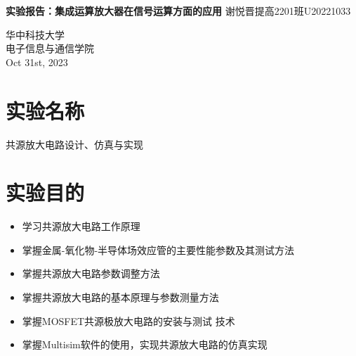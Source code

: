 \documentclass[a4paper,11pt,UTF8]{article}
\numberwithin{equation}{subsection}
\begin{document}
\begin{titlepage}
	\begin{center}
		\vspace*{1cm}
		\textbf{\LARGE 实验报告：集成运算放大器在信号运算方面的应用}
		\vspace{0.5cm}
		\Large 谢悦晋\quad 提高2201班\quad U20221033
		\vspace{1cm}
		\begin{figure}[H]
			\centering
			\caption*{}
		\end{figure}
		\vfill
		\vspace{0.8cm}
		华中科技大学 \\
		电子信息与通信学院 \\
		Oct 31st, 2023
	\end{center}
\end{titlepage}
\tableofcontents\newpage
\section{实验名称}
共源放大电路设计、仿真与实现
\section{实验目的}
\begin{itemize}
	\item 学习共源放大电路工作原理
	\item 掌握金属-氧化物-半导体场效应管的主要性能参数及其测试方法
	\item 掌握共源放大电路参数调整方法
	\item 掌握共源放大电路的基本原理与参数测量方法
	\item 掌握MOSFET共源极放大电路的安装与测试 技术
	\item 掌握Multisim软件的使用，实现共源放大电路的仿真实现
\end{itemize}
\end{document}
